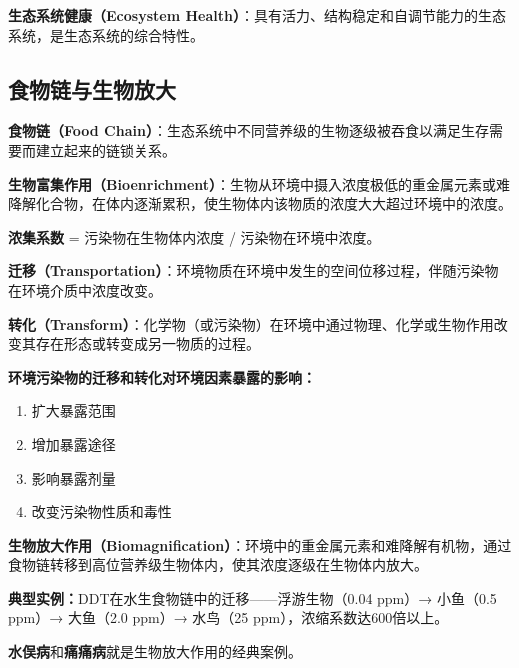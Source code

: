\begin{defbox}
\textbf{生态系统健康（Ecosystem Health）}：具有活力、结构稳定和自调节能力的生态系统，是生态系统的综合特性。
\end{defbox}

\subsection{食物链与生物放大}

\begin{defbox}
\textbf{食物链（Food Chain）}：生态系统中不同营养级的生物逐级被吞食以满足生存需要而建立起来的链锁关系。
\end{defbox}

\begin{defbox}
\textbf{生物富集作用（Bioenrichment）}：生物从环境中摄入浓度极低的重金属元素或难降解化合物，在体内逐渐累积，使生物体内该物质的浓度大大超过环境中的浓度。

\textbf{浓集系数} = 污染物在生物体内浓度 / 污染物在环境中浓度。
\end{defbox}

\begin{defbox}
\textbf{迁移（Transportation）}：环境物质在环境中发生的空间位移过程，伴随污染物在环境介质中浓度改变。

\textbf{转化（Transform）}：化学物（或污染物）在环境中通过物理、化学或生物作用改变其存在形态或转变成另一物质的过程。
\end{defbox}

\begin{keybox}
\textbf{环境污染物的迁移和转化对环境因素暴露的影响：}
\begin{enumerate}[leftmargin=*]
    \item 扩大暴露范围
    \item 增加暴露途径
    \item 影响暴露剂量
    \item 改变污染物性质和毒性
\end{enumerate}

\textbf{生物放大作用（Biomagnification）}：环境中的重金属元素和难降解有机物，通过食物链转移到高位营养级生物体内，使其浓度逐级在生物体内放大。

\textbf{典型实例：}DDT在水生食物链中的迁移——浮游生物（0.04 ppm）→ 小鱼（0.5 ppm）→ 大鱼（2.0 ppm）→ 水鸟（25 ppm），浓缩系数达600倍以上。

\textbf{水俣病}和\textbf{痛痛病}就是生物放大作用的经典案例。
\end{keybox}

